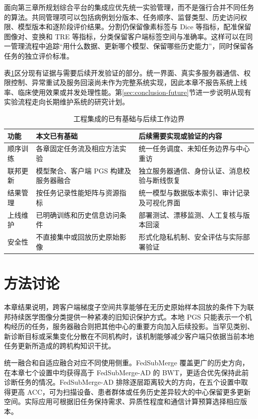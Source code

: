 面向第三章所规划综合平台的集成应优先统一实验管理，而不是强行合并不同任务的算法。共同管理项可以包括病例划分版本、任务顺序、监督类型、历史访问权限、模型版本和逐阶段评价结果。分割仍保留像素标签与 Dice 等指标，配准保留图像对、变换和 TRE 等指标，分类保留客户端标签空间与准确率。这样可以在同一管理流程中追踪“用什么数据、更新哪个模型、保留哪些历史能力”，同时保留各任务的独立评价标准。

表\ref{tab:fedsubmerge-system-boundary}区分现有证据与需要后续开发验证的部分。统一界面、真实多服务器通信、权限控制、异常重试及服务回滚尚未作为完整系统实现，因此本章不报告系统上线率、临床使用效果或并发处理性能。第\ref{sec:conclusion-future}节进一步说明从现有实验流程走向长期维护系统的研究计划。

\begin{table}[htbp]
\centering
\caption{工程集成的已有基础与后续工作边界}
\label{tab:fedsubmerge-system-boundary}
\thesistablefont
\setlength{\tabcolsep}{3pt}
\renewcommand{\arraystretch}{1.18}
\begin{tabularx}{\textwidth}{@{}p{2.0cm}XX@{}}
\toprule
功能 & 本文已有基础 & 后续需要实现或验证的内容 \\
\midrule
顺序训练 & 各章固定任务流及相应方法实验 & 统一任务调度、未知任务边界与中心重访 \\
联邦更新 & 模型聚合、客户端 PGS 构建及服务器融合 & 独立服务器通信、身份认证、消息校验与断线恢复 \\
结果管理 & 按任务记录性能矩阵与资源指标 & 统一模型与数据版本索引、审计记录及可视化界面 \\
上线维护 & 已明确训练和历史信息访问条件 & 部署测试、漂移监测、人工复核与版本回滚 \\
安全性 & 不直接集中或回放历史原始影像 & 形式化隐私机制、安全评估与实际部署验证 \\
\bottomrule
\end{tabularx}
\end{table}

\section{方法讨论}
\label{sec:fedsubmerge-discussion}

本章结果说明，跨客户端梯度子空间共享能够在无历史原始样本回放的条件下为联邦持续医学图像分类提供一种紧凑的旧知识保护方式。本地 PGS 只能表示一个机构经历的任务，服务器融合则把其他中心的重要方向加入后续投影。当罕见类别、新诊断目标或采集变化分散在不同机构时，该机制能够减少客户端只依据当前本地任务更新所造成的跨机构知识干扰。

统一融合和自适应融合对应不同使用侧重。FedSubMerge 覆盖更广的历史方向，在本章七个设置中均获得高于 FedSubMerge-AD 的 BWT，更适合优先保持此前诊断任务的情况。FedSubMerge-AD 排除逐层距离较大的方向，在五个设置中取得更高 ACC，可为扫描设备、患者群体或任务历史差异较大的中心保留更多更新空间。实际应用可根据旧任务保持需求、异质性程度和通信计算预算选择相应版本。

